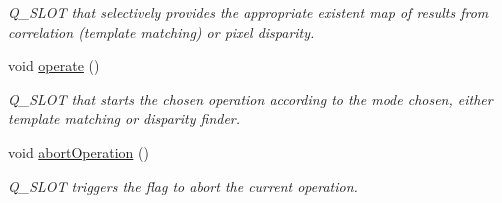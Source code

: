 \begin{DoxyCompactItemize}
\begin{DoxyCompactList}\small\item\em Q\_\-SLOT that selectively provides the appropriate existent map of results from correlation (template matching) or pixel disparity. \item\end{DoxyCompactList}\item 
\hypertarget{classQcorr_af71bf39d4955ab90b859e8137b6e0761}{
void \hyperlink{classQcorr_af71bf39d4955ab90b859e8137b6e0761}{operate} ()}
\label{classQcorr_af71bf39d4955ab90b859e8137b6e0761}

\begin{DoxyCompactList}\small\item\em Q\_\-SLOT that starts the chosen operation according to the mode chosen, either template matching or disparity finder. \item\end{DoxyCompactList}\item 
\hypertarget{classQcorr_ad6e0fb9461faffd01afbf62e1a0be4c3}{
void \hyperlink{classQcorr_ad6e0fb9461faffd01afbf62e1a0be4c3}{abortOperation} ()}
\label{classQcorr_ad6e0fb9461faffd01afbf62e1a0be4c3}

\begin{DoxyCompactList}\small\item\em Q\_\-SLOT triggers the flag to abort the current operation. \item\end{DoxyCompactList}\end{DoxyCompactItemize}
